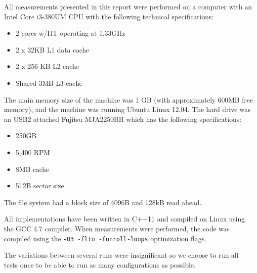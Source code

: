All measurements presented in this report were performed on a computer
with an Intel Core i3-380UM CPU with the following technical
specifications:
\begin{itemize}
\item 2 cores w/HT operating at 1.33GHz
\item 2 x 32KB L1 data cache
\item 2 x 256 KB L2 cache
\item Shared 3MB L3 cache
\end{itemize}
The main memory size of the machine was 1 GB (with approximately 600MB free memory), and the machine was running Ubuntu
Linux 12.04. The hard drive was an USB2 attached Fujitsu MJA2250BH which has the following specifications:

\begin{itemize}
\item 250GB
\item 5,400 RPM
\item 8MB cache
\item 512B sector size
\end{itemize}

The file system had a block size of 4096B and 128kB read ahead.

All implementations have been
written in C++11 and compiled on Linux using the GCC 4.7 compiler. When measurements were performed, the
code was compiled using the \texttt{-O3 -flto -funroll-loops}
optimization flags.

The variations between several runs were insignificant so we choose to run all tests once to be able to run as many configurations as possible.